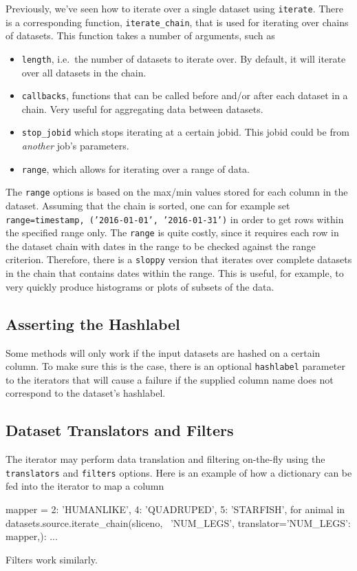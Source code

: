 \documentclass[a4paper]{article}
\begin{document}
Previously, we've seen how to iterate over a single dataset using
\texttt{iterate}.  There is a corresponding function,
\texttt{iterate\_chain}, that is used for iterating over chains of
datasets.  This function takes a number of arguments, such as
\begin{itemize}
\item[] \texttt{length}, i.e.\ the number of datasets to iterate over.
  By default, it will iterate over all datasets in the chain.
\item[] \texttt{callbacks}, functions that can be called before and/or
  after each dataset in a chain.  Very useful for aggregating data
  between datasets.
\item[] \texttt{stop\_jobid} which stops iterating at a certain jobid.
  This jobid could be from \textsl{another} job's parameters.
\item[] \texttt{range}, which allows for iterating over a range of
  data.
\end{itemize}
The \texttt{range} options is based on the max/min values stored for
each column in the dataset.  Assuming that the chain is sorted, one
can for example set 
\texttt{range={timestamp, ('2016-01-01', '2016-01-31')}}
in order to get rows within the specified range only.  The %
\texttt{range} is quite costly, since it requires each row in the
dataset chain with dates in the range to be checked against the range
criterion.  Therefore, there is a \texttt{sloppy} version that
iterates over complete datasets in the chain that contains dates
within the range.  This is useful, for example, to very quickly
produce histograms or plots of subsets of the data.




\subsection{Asserting the Hashlabel}
Some methods will only work if the input datasets are hashed on a
certain column.  To make sure this is the case, there is an optional
\texttt{hashlabel} parameter to the iterators that will cause a
failure if the supplied column name does not correspond to the
dataset's hashlabel.




\subsection{Dataset Translators and Filters}

The iterator may perform data translation and filtering on-the-fly
using the \texttt{translators} and \texttt{filters} options.  Here is
an example of how a dictionary can be fed into the iterator to map a
column
\begin{python}
  mapper = {2: ’HUMANLIKE’, 4: ’QUADRUPED’, 5: ’STARFISH’,}
  for animal in datasets.source.iterate_chain(sliceno, \
     ’NUM_LEGS’, translator={’NUM_LEGS’: mapper,}):
  ...
\end{python}
Filters work similarly.
\end{document}

